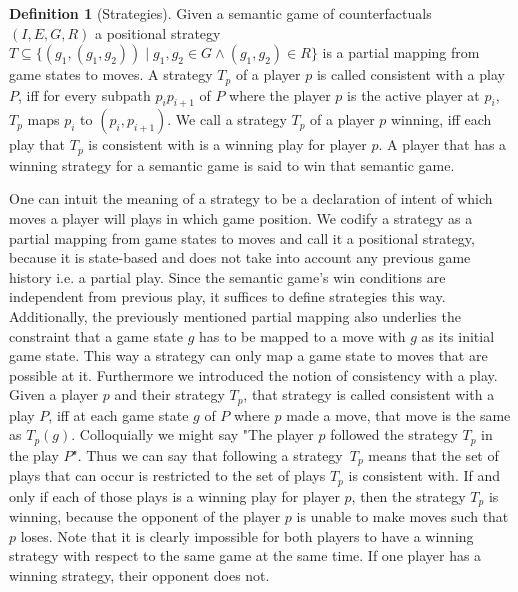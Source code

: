 \documentclass[a4paper,american]{paper}
\theoremstyle{definition}\newtheorem{definition}{Definition}
\begin{document}
\begin{definition}[Strategies]
Given a semantic game of counterfactuals $(I, E, G, R)$ a positional strategy $T\subseteq\{(g_1,(g_1,g_2))\mid g_1,g_2\in G\wedge (g_1,g_2)\in R\}$ is a partial mapping from game states to moves. A strategy $T_p$ of a player $p$ is called consistent with a play $P$, iff for every subpath $p_ip_{i+1}$ of $P$ where the player $p$ is the active player at $p_i$, $T_p$ maps $p_i$ to $(p_i,p_{i+1})$. We call a strategy $T_p$ of a player $p$ winning, iff each play that $T_p$ is consistent with is a winning play for player $p$. A player that has a winning strategy for a semantic game is said to win that semantic game.
\end{definition}
One can intuit the meaning of a strategy to be a declaration of intent of which moves a player will plays in which game position. We codify a strategy as a partial mapping from game states to moves and call it a positional strategy, because it is state-based and does not take into account any previous game history i.e. a partial play. Since the semantic game's win conditions are independent from previous play, it suffices to define strategies this way. Additionally, the previously mentioned partial mapping also underlies the constraint that a game state $g$ has to be mapped to a move with $g$ as its initial game state. This way a strategy can only map a game state to moves that are possible at it. Furthermore we introduced the notion of consistency with a play. Given a player $p$ and their strategy $T_p$, that strategy is called consistent with a play $P$, iff at each game state $g$ of $P$ where $p$ made a move, that move is the same as $T_p(g)$. Colloquially we might say "The player $p$ followed the strategy $T_p$ in the play $P$". Thus we can say that following a strategy~$T_p$ means that the set of plays that can occur is restricted to the set of plays $T_p$ is consistent with. If and only if each of those plays is a winning play for player $p$, then the strategy $T_p$ is winning, because the opponent of the player $p$ is unable to make moves such that $p$ loses. Note that it is clearly impossible for both players to have a winning strategy with respect to the same game at the same time. If one player has a winning strategy, their opponent does not.
\end{document}
